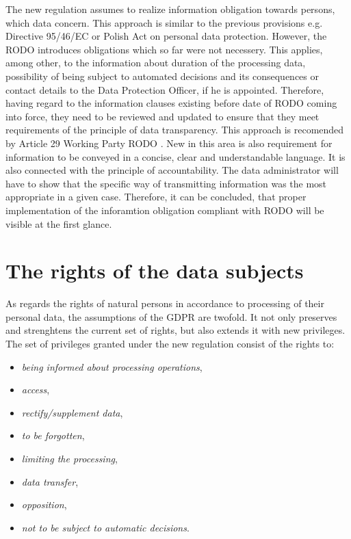 \documentclass[en, noamssymb]{mgr}
\begin{document}
The new regulation assumes to realize information obligation towards persons, which data concern. This approach is similar to the previous provisions e.g. Directive 95/46/EC or Polish Act on personal data protection. However, the RODO introduces obligations which so far were not necessery. This applies, among other, to the information about duration of the processing data, possibility of being subject to automated decisions and its consequences or contact details to the Data Protection Officer, if he is appointed. Therefore, having regard to the information clauses existing before date of RODO coming into force, they need to be reviewed and updated to ensure that they meet requirements of the principle of data transparency. This approach is recomended by Article 29 Working Party RODO \cite{delloite_inform}. New in this area is also requirement for information to be conveyed in a concise, clear and understandable language. It is also connected with the principle of accountability. The data administrator will have to show that the specific way of transmitting information was the most appropriate in a given case. Therefore, it can be concluded, that proper implementation of the inforamtion obligation compliant with RODO will be visible at the first glance.

\section{The rights of the data subjects}

As regards the rights of natural persons in accordance to processing of their personal data, the assumptions of the GDPR are twofold. It not only preserves and strenghtens the current set of rights, but also extends it with new privileges.
The set of privileges granted under the new regulation consist of the rights to\cite{giodo}:

\begin{itemize}

\item \textit{being informed about processing operations},

\item \textit{access},

\item \textit{rectify/supplement data},

\item \textit{to be forgotten},

\item \textit{limiting the processing},

\item \textit{data transfer},

\item \textit{opposition},

\item \textit{not to be subject to automatic decisions}.

\end{itemize}
\end{document}
